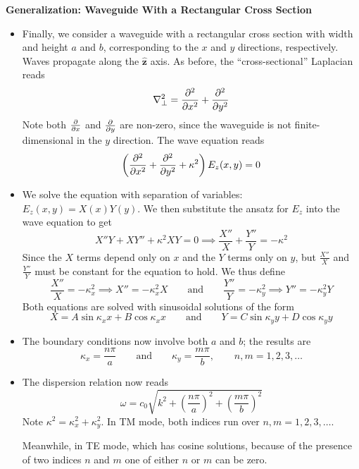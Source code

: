\documentclass[11pt, a4paper]{article}
\newcommand{\eqtext}[1]{\qquad \text{#1} \qquad}
\renewcommand{\vec}[1]{\bm{#1}} %
\newcommand{\uvec}[1]{\hat{\vec{#1}}} %
\renewcommand{\laplacian}{\nabla^{2}}
\begin{document}
\textbf{Generalization: Waveguide With a Rectangular Cross Section}
\begin{itemize}
	\item Finally, we consider a waveguide with a rectangular cross section with width and height $ a $ and $ b $, corresponding to the $ x $ and $ y $ directions, respectively. Waves propagate along the $ \uvec{z} $ axis. As before, the ``cross-sectional'' Laplacian reads
	\begin{equation*}
		\laplacian_{\perp} = \pdv[2]{}{x} + \pdv[2]{}{y}
	\end{equation*}
	Note both $ \pdv{x} $ and $ \pdv{y} $ are non-zero, since the waveguide is not finite-dimensional in the $ y $ direction. The wave equation reads
	\begin{equation*}
		\left(\pdv[2]{}{x} + \pdv[2]{}{y} + \kappa^{2}\right)E_{z}(x, y) = 0
	\end{equation*}
	
	\item We solve the equation with separation of variables: $ E_{z}(x, y) = X(x)Y(y) $. We then substitute the ansatz for $ E_{z} $ into the wave equation to get
	\begin{equation*}
		X''Y + XY'' + \kappa^{2}XY = 0 \implies \frac{X''}{X} + \frac{Y''}{Y} = - \kappa^{2}
	\end{equation*}
	Since the $ X $ terms depend only on $ x $ and the $ Y $ terms only on $ y $, but $ \frac{X''}{X} $ and $ \frac{Y''}{Y} $ must be constant for the equation to hold. We thus define
	\begin{equation*}
		\frac{X''}{X} = - \kappa_{x}^{2} \implies 	X'' = - \kappa_{x}^{2}X \eqtext{and} \frac{Y''}{Y} = - \kappa_{y}^{2} \implies  Y'' = - \kappa_{y}^{2}Y 
	\end{equation*}
	Both equations are solved with sinusoidal solutions of the form
	\begin{equation*}
		X = A\sin \kappa_{x}x + B \cos \kappa_{x}x \eqtext{and} Y = C\sin \kappa_{y}y + D \cos \kappa_{y}y
	\end{equation*}
	
	\item The boundary conditions now involve both $ a $ and $ b $; the results are
	\begin{equation*}
		\kappa_{x} = \frac{n\pi }{a}\eqtext{and} \kappa_{y} = \frac{m \pi}{b}, \qquad n, m = 1, 2, 3, \ldots
	\end{equation*}
	

	\item  The dispersion relation now reads
	\begin{equation*}
		\omega = c_{0} \sqrt{k^{2} + \left(\frac{n\pi}{a}\right)^{2} +  \left(\frac{m\pi}{b}\right)^{2}}
	\end{equation*}
	Note $ \kappa^{2} = \kappa_{x}^{2} + \kappa_{y}^{2} $. In TM mode, both indices run over $ n, m = 1, 2, 3, \ldots $. 
	
	Meanwhile, in TE mode, which has cosine solutions, because of the presence of two indices $ n $ and $ m $ one of either $ n $ or $ m $ can be zero.
	
\end{itemize}
\end{document}
